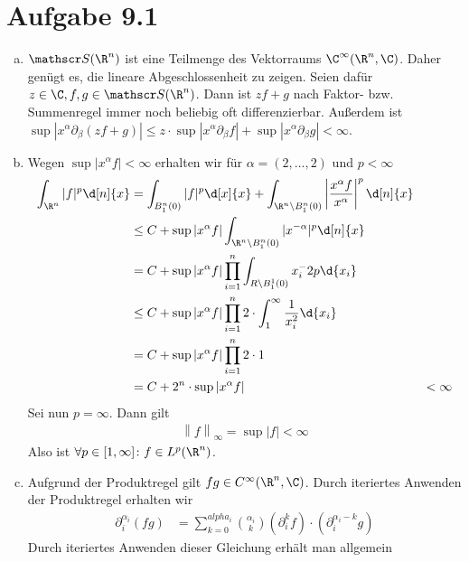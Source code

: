 \documentclass{article}
\newcommand{\norm}[1]{\left\lVert #1 \right\rVert}
\begin{document}
\def\headheight{25pt}
    \section*{Aufgabe 9.1}
    \begin{enumerate}[(a)]
        \item $\mathscr S(\R^n)$ ist eine Teilmenge des Vektorraums $\C^\infty(\R^n, \C)$. Daher genügt es, die lineare Abgeschlossenheit zu zeigen.
        Seien dafür $z \in \C, f, g\in \mathscr S(\R^n)$. Dann ist $zf + g$ nach Faktor- bzw. Summenregel immer noch beliebig oft differenzierbar. Außerdem ist $\sup |x^\alpha \partial_\beta (zf + g)| \leq z \cdot \sup |x^\alpha \partial_\beta f| + \sup |x^\alpha \partial_\beta g| < \infty$.
        \item Wegen $\sup |x^\alpha f| <\infty$ erhalten wir für $\alpha = (2, \dots, 2)$ und $p < \infty$
        \begin{align*}
            \int_{\R^n} |f|^p \d[n]{x} &= \int_{B^n_1(0)} |f|^p \d[x]{x} + \int_{\R^n \setminus B^n_1(0)} \left|\frac{x^\alpha f}{x^\alpha}\right|^p \d[n]{x}\\
            &\leq C + \sup |x^\alpha f| \int_{\R^n \setminus B^n_1(0)} |x^{-\alpha}|^p \d[n]{x}\\
            &= C + \sup |x^\alpha f| \prod_{i = 1}^n \int_{R\setminus B^1_1(0)} x_i^-2p \d{x_i}\\
            &\leq C + \sup |x^\alpha f| \prod_{i = 1}^n 2 \cdot \int_1^\infty \frac{1}{x_i^2} \d{x_i}\\
            &= C + \sup |x^\alpha f| \prod_{i = 1}^n 2 \cdot 1\\
            &= C + 2^n \cdot \sup |x^\alpha f|
            &< \infty
        \end{align*}
        Sei nun $p = \infty$. Dann gilt
        \begin{align*}
            \norm{f}_\infty = \sup |f| < \infty
        \end{align*}
        Also ist $\forall p \in [1, \infty] \colon f \in L^p(\R^n)$.
        \item Aufgrund der Produktregel gilt $fg \in C^\infty(\R^n, \C)$. 
        Durch iteriertes Anwenden der Produktregel erhalten wir
        \begin{align*}
            \partial_i^{\alpha_i} (fg) &= \sum_{k = 0}^{alpha_i} \binom{\alpha_i}{k} (\partial_i^k f) \cdot (\partial_i^{\alpha_i - k}g)
        \end{align*}
        Durch iteriertes Anwenden dieser Gleichung erhält man allgemein 

\end{enumerate}
\end{document}
